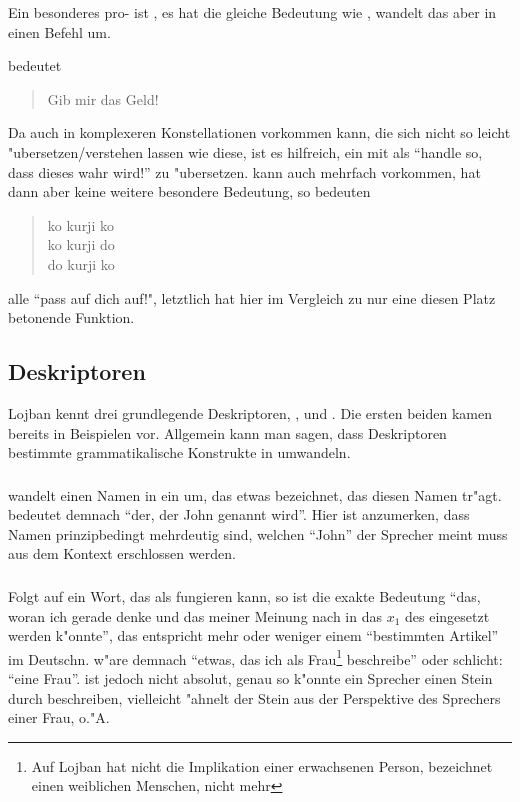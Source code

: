 Ein besonderes pro- ist , es hat die gleiche Bedeutung wie , wandelt das  aber in einen Befehl um.
\begin{quote}
\end{quote}
bedeutet
\begin{quote}
Gib mir das Geld!
\end{quote}
Da  auch in komplexeren Konstellationen vorkommen kann, die sich nicht so leicht "ubersetzen/verstehen lassen wie diese, ist es hilfreich, ein  mit  als ``handle so, dass dieses  wahr wird!'' zu "ubersetzen.
 kann auch mehrfach vorkommen, hat dann aber keine weitere besondere Bedeutung, so bedeuten
\begin{quote}
ko kurji ko \\
ko kurji do \\
do kurji ko
\end{quote}
alle ``pass auf dich auf!", letztlich hat hier  im Vergleich zu  nur eine diesen Platz betonende Funktion.

\subsection{Deskriptoren}
Lojban kennt drei grundlegende Deskriptoren, ,  und . Die ersten beiden kamen bereits in Beispielen vor.
Allgemein kann man sagen, dass Deskriptoren bestimmte grammatikalische Konstrukte in  umwandeln.

\subsubsection{}
 wandelt einen Namen in ein  um, das etwas bezeichnet, das diesen Namen tr"agt.  bedeutet demnach ``der,
der John genannt wird''. Hier ist anzumerken, dass Namen prinzipbedingt mehrdeutig sind, welchen ``John'' der Sprecher meint muss aus dem Kontext
erschlossen werden.

\subsubsection{}
Folgt auf  ein Wort, das als  fungieren kann, so ist die exakte Bedeutung ``das, woran ich gerade denke und das meiner
Meinung nach in das $x_1$ des  eingesetzt werden k"onnte'', das entspricht mehr oder weniger einem ``bestimmten Artikel'' im Deutschn.
 w"are demnach ``etwas, das ich als Frau\footnote{Auf Lojban hat  nicht die Implikation einer erwachsenen Person,
 bezeichnet einen weiblichen Menschen, nicht mehr} beschreibe'' oder schlicht: ``eine Frau''.  ist jedoch nicht absolut,
genau so k"onnte ein Sprecher einen Stein durch  beschreiben, vielleicht "ahnelt der Stein aus der Perspektive des Sprechers einer
Frau, o."A.


